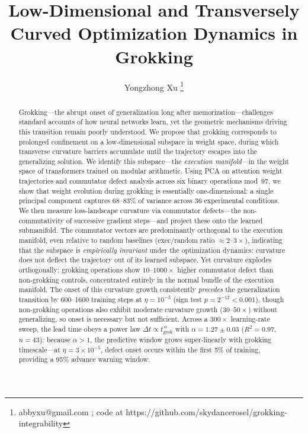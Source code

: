 \documentclass[11pt]{article}
\title{Low-Dimensional and Transversely Curved Optimization Dynamics in Grokking}
\author{%
  Yongzhong Xu
  \thanks{abbyxu@gmail.com ; code at https://github.com/skydancerosel/grokking-integrability}
}
\date{}
\begin{document}
\maketitle

\begin{abstract}

Grokking---the abrupt onset of generalization long after memorization---challenges standard accounts of how neural networks learn, yet the geometric mechanisms driving this transition remain poorly understood.
We propose that grokking corresponds to prolonged confinement on a low-dimensional subspace in weight space, during which transverse curvature barriers accumulate until the trajectory escapes into the generalizing solution.
We identify this subspace---the \emph{execution manifold}---in the weight space of transformers trained on modular arithmetic.
Using PCA on attention weight trajectories and commutator defect analysis across six binary operations mod~97, we show that weight evolution during grokking is essentially one-dimensional: a single principal component captures 68--83\% of variance across 36 experimental conditions.
We then measure loss-landscape curvature via commutator defects---the non-commutativity of successive gradient steps---and project these onto the learned submanifold.
The commutator vectors are predominantly orthogonal to the execution manifold, even relative to random baselines (exec/random ratio $\approx 2$--$3\times$), indicating that the subspace is \emph{empirically invariant} under the optimization dynamics: curvature does not deflect the trajectory out of its learned subspace.
Yet curvature explodes orthogonally: grokking operations show $10$--$1000\times$ higher commutator defect than non-grokking controls, concentrated entirely in the normal bundle of the execution manifold.
The onset of this curvature growth consistently \emph{precedes} the generalization transition by 600--1600 training steps at $\eta = 10^{-3}$ (sign test $p = 2^{-12} < 0.001$), though non-grokking operations also exhibit moderate curvature growth ($30$--$50\times$) without generalizing, so onset is necessary but not sufficient.
Across a $300\times$ learning-rate sweep, the lead time obeys a power law $\Delta t \propto t_{\mathrm{grok}}^{\,\alpha}$ with $\alpha = 1.27 \pm 0.03$ ($R^2 = 0.97$, $n = 43$): because $\alpha > 1$, the predictive window grows super-linearly with grokking timescale---at $\eta = 3\!\times\!10^{-5}$, defect onset occurs within the first 5\% of training, providing a 95\% advance warning window.

\end{abstract}
\end{document}
